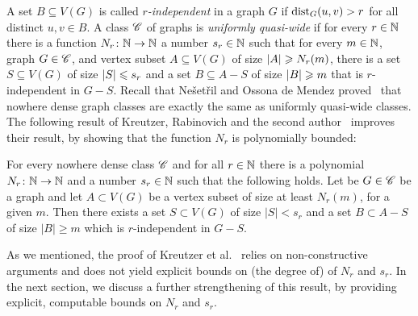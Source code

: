 A set $B\subseteq V(G)$ is called {\em{$r$-independent}} in a graph
$G$ if $\mathrm{dist}_G(u,v)>r$ for all distinct $u,v\in B$.  A class $\mathscr{C}$
of graphs is \emph{uniformly quasi-wide} if for every $r\in \mathbb{N}$ there
is a function $N_r\colon\mathbb{N}\to\mathbb{N}$ a number $s_r\in \mathbb{N}$ such that for
every $m\in \mathbb{N}$, graph $G\in \mathscr{C}$, and vertex subset
$A\subseteq V(G)$ of size $\left\lvert A\right\rvert\geqslant N_r(m)$, there is a set
$S\subseteq V(G)$ of size $\left\lvert S\right\rvert\leqslant s_r$ and a set $B\subseteq A-S$
of size $\left\lvert B\right\rvert\geqslant m$ that is $r$-independent in $G-S$.  Recall that
Ne\v set\v ril and Ossona de Mendez
proved~\cite{nevsetvril2011nowhere} that nowhere dense graph classes
are exactly the same as uniformly quasi-wide classes.  The following
result of Kreutzer, Rabinovich and the second
author~\cite{siebertz2016polynomial} improves their result, by showing
that the function $N_r$ is polynomially bounded:


\begin{theorem}\label{thm:krs}
  For every nowhere dense class $\mathscr{C}$ and for all $r\in \mathbb{N}$ there is
  a polynomial $N_r\colon \mathbb{N}\to\mathbb{N}$ and a number $s_r\in \mathbb{N}$ such that
  the following holds.  Let be $G\in \mathscr{C}$ be a graph and let
  $A\subset V(G)$ be a vertex subset of size at least $N_r(m)$, for a
  given $m$.  Then there exists a set $S\subset V(G)$ of size
  $|S|<s_r$ and a set $B\subset A-S$ of size $|B|\ge m$ which is
  $r$-independent in $G-S$.
\end{theorem}

As we mentioned, the proof of Kreutzer et
al.~\cite{siebertz2016polynomial} relies on non-constructive arguments
and does not yield explicit bounds on (the degree of) of $N_r$ and
$s_r$.  In the next section, we discuss a further strengthening of
this result, by providing explicit, computable bounds on $N_r$ and
$s_r$.
